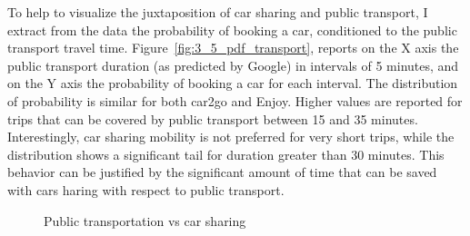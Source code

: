 
To help to visualize the juxtaposition of car sharing and public transport, I extract from the data the probability of booking a car, conditioned to the public transport travel time. Figure~\ref{fig:3_5_pdf_transport}, reports on the X axis the public transport duration (as predicted by Google) in intervals of 5 minutes, and on the Y axis the probability of booking a car for each interval.
The distribution of probability is similar for both car2go and Enjoy. Higher values are reported for trips that can be covered by public transport between 15 and 35 minutes. Interestingly, car sharing mobility is not preferred for very short trips, while the distribution shows a significant tail for duration greater than 30 minutes. This behavior can be justified by the significant amount of time that can be saved with cars haring with respect to public transport.

  
  \begin{figure}[t!]
  \centering     %
  \caption{Public transportation vs car sharing \label{fig:3_5_public_transport}}
  \end{figure}
  
  
 
